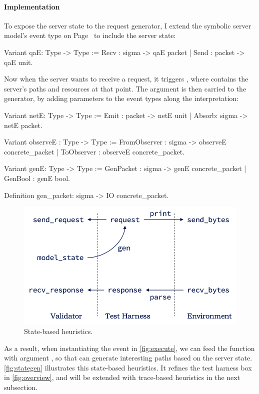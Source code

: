 \paragraph{Implementation}
To expose the server state to the request generator, I extend the symbolic
server model's  event type on Page~\pageref{def:symbolic-qae} to
include the server state:
\begin{coq}
  Variant qaE: Type -> Type :=
    Recv : sigma      -> qaE packet
  | Send : packet -> qaE unit.
\end{coq}

Now when the server wants to receive a request, it triggers ,
where  contains the server's paths and resources at that
point.  The  argument is then carried to the generator, by adding
parameters to the event types along the interpretation:
\begin{coq}
  Variant netE: Type -> Type :=
    Emit  : packet -> netE unit
  | Absorb: sigma      -> netE packet.

  Variant observeE : Type -> Type :=
    FromObserver   : sigma -> observeE concrete_packet
  | ToObserver     : observeE concrete_packet.

  Variant genE: Type -> Type :=
    GenPacket : sigma -> genE concrete_packet
  | GenBool   : genE bool.

  Definition gen_packet: sigma -> IO concrete_packet.
\end{coq}

\begin{figure}
\includegraphics[width=.6\linewidth]{figures/stategen}
\caption{State-based heuristics.}
\label{fig:stategen}
\end{figure}

As a result, when instantiating the  event in
\autoref{fig:execute}, we can feed the  function with argument
, so that  can generate interesting paths based on the
server state.  \autoref{fig:stategen} illustrates this state-based heuristics.
It refines the test harness box in \autoref{fig:overview}, and will be extended
with trace-based heuristics in the next subsection.


